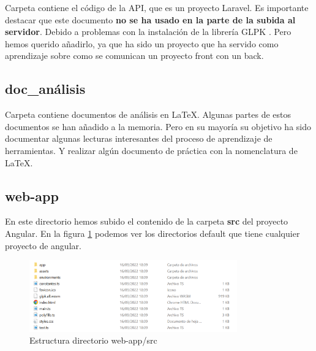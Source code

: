 Carpeta contiene el código de la API, que es un proyecto Laravel. Es importante destacar que este documento \textbf{no se ha usado en la parte de la subida al servidor}. Debido a problemas con la instalación de la librería GLPK \cite{glpk:package}. Pero hemos querido añadirlo, ya que ha sido un proyecto que ha servido como aprendizaje sobre como se comunican un proyecto front con un back.


\subsection{doc\_análisis}

Carpeta contiene documentos de análisis en \LaTeX. Algunas partes de estos documentos se han añadido a la memoria. Pero en su mayoría su objetivo ha sido documentar algunas lecturas interesantes del proceso de aprendizaje de herramientas. Y realizar algún documento de práctica con la nomenclatura de \LaTeX.


\subsection{web-app}

En este directorio hemos subido el contenido de la carpeta \textbf{src} del proyecto Angular. En la figura \ref{fig:src_angular} podemos ver los directorios default que tiene cualquier proyecto de angular.

\begin{figure}[h!] 
\centering
    \includegraphics[width=0.8\textwidth]{img/src_angular.PNG}
\caption{Estructura directorio web-app/src}
\label{fig:src_angular}
\end{figure}


